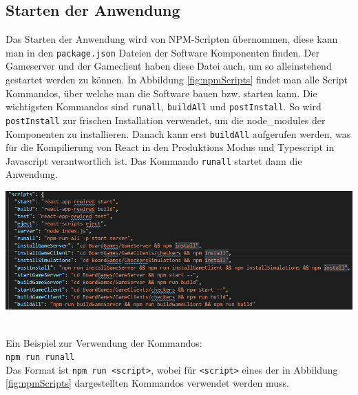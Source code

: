 \documentclass[12pt,a4paper,bibliography=totocnumbered,listof=totocnumbered]{article}
\begin{document}
\begin{appendix}
\pagebreak

\section{Starten der Anwendung}
\label{apx:appStarten}
Das Starten der Anwendung wird von NPM-Scripten übernommen, diese kann man in den \texttt{package.json} Dateien der Software Komponenten finden.
Der Gameserver und der Gameclient haben diese Datei auch, um so alleinstehend gestartet werden zu können. 
In Abbildung \ref{fig:npmScripts} findet man alle Script Kommandos, über welche man die Software bauen bzw. starten kann.
Die wichtigsten Kommandos sind \texttt{runall}, \texttt{buildAll} und \texttt{postInstall}. So wird \texttt{postInstall} zur 
frischen Installation verwendet, um die node\_modules der Komponenten zu installieren. Danach kann erst \texttt{buildAll} aufgerufen werden, 
was für die Kompilierung von React in den Produktions Modus und Typescript in Javascript verantwortlich ist. 
Das Kommando \texttt{runall} startet dann die Anwendung.

\vspace{1em}
\begin{minipage}{\linewidth}
	\centering
	\includegraphics[width=0.7\linewidth]{pics/npmScripts.png}
    \label{fig:npmScripts}
\end{minipage}
\\

Ein Beispiel zur Verwendung der Kommandos:
\\
\texttt{npm run runall}
\\
Das Format ist \texttt{npm run <script>}, wobei für \texttt{<script>} eines der in Abbildung \ref{fig:npmScripts} dargestellten Kommandos verwendet werden muss.

\end{appendix}


\pagebreak
\end{document}
